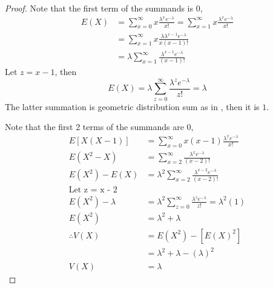 \begin{proof}
    Note that the first term of the summands is 0,
    \begin{align*}
        E(X) &= \sum^\infty_{x = 0} x\frac{\lambda^x e^{-\lambda}}{x!}
        = \sum^\infty_{x = 1} x\frac{\lambda^x e^{-\lambda}}{x!} \\
        &= \sum^\infty_{x = 1} x\frac{\lambda \lambda^{x-1} e^{-\lambda}}{x(x-1)!} \\
        &= \lambda \sum^\infty_{x = 1} \frac{\lambda^{x-1} e^{-\lambda}}{(x-1)!}
    \end{align*}
    Let $z = x - 1$, then
    \[
        E(X) =\lambda \sum^\infty_{z = 0} \frac{\lambda^z e^{-\lambda}}{z!} = \lambda
    \]
    The latter summation is geometric distribution sum as in , then it is $1$.
    
    Note that the first 2 terms of the summands are 0,
    \begin{align*}
        E[X(X-1)] 
            &= \sum^\infty_{x = 0} x(x-1)\frac{\lambda^x e^{-\lambda}}{x!} \\
        E(X^2 - X)
            &= \sum^\infty_{x = 2} \frac{\lambda^x e^{-\lambda}}{(x-2)!} \\
        E(X^2) - E(X)   
            &= \lambda^2 \sum^\infty_{x = 2} \frac{\lambda^{x-2} e^{-\lambda}}{(x-2)!} \\
        \text{Let z = x - 2} \\
        E(X^2) - \lambda
            &= \lambda^2 \sum^\infty_{z = 0} \frac{\lambda^z e^{-\lambda}}{z!}
            = \lambda^2 (1) \\
        E(X^2) &= \lambda^2 + \lambda \\
        \therefore 
            V(X) &= E(X^2) - [E(X)^2] \\
                &= \lambda^2 + \lambda - (\lambda)^2 \\
            V(X)   &= \lambda
    \end{align*}
\end{proof}



